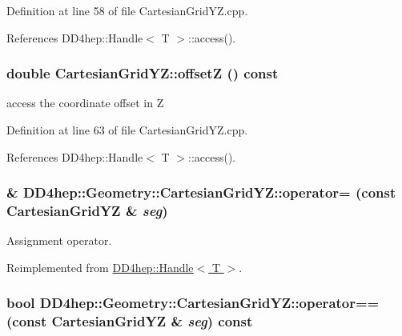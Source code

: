 Definition at line 58 of file CartesianGridYZ.cpp.

References DD4hep::Handle$<$ T $>$::access().\hypertarget{class_d_d4hep_1_1_geometry_1_1_cartesian_grid_y_z_aa7bdd306e50ec2ff182cb51f3ce4704f}{
\subsubsection[{offsetZ}]{\setlength{\rightskip}{0pt plus 5cm}double CartesianGridYZ::offsetZ () const}}
\label{class_d_d4hep_1_1_geometry_1_1_cartesian_grid_y_z_aa7bdd306e50ec2ff182cb51f3ce4704f}


access the coordinate offset in Z 

Definition at line 63 of file CartesianGridYZ.cpp.

References DD4hep::Handle$<$ T $>$::access().\hypertarget{class_d_d4hep_1_1_geometry_1_1_cartesian_grid_y_z_a5b597a85e6916bf6f4a61123d6bfada3}{
\subsubsection[{operator=}]{\& DD4hep::Geometry::CartesianGridYZ::operator= (const {\bf CartesianGridYZ} \& {\em seg})}}
\label{class_d_d4hep_1_1_geometry_1_1_cartesian_grid_y_z_a5b597a85e6916bf6f4a61123d6bfada3}


Assignment operator. 

Reimplemented from \hyperlink{class_d_d4hep_1_1_handle_a9bbf8f498df42e81ad26fb00233505a6}{DD4hep::Handle$<$ T $>$}.\hypertarget{class_d_d4hep_1_1_geometry_1_1_cartesian_grid_y_z_a31f625c0056287ae2d993317ed3c661e}{
\subsubsection[{operator==}]{\setlength{\rightskip}{0pt plus 5cm}bool DD4hep::Geometry::CartesianGridYZ::operator== (const {\bf CartesianGridYZ} \& {\em seg}) const}}
\label{class_d_d4hep_1_1_geometry_1_1_cartesian_grid_y_z_a31f625c0056287ae2d993317ed3c661e}


